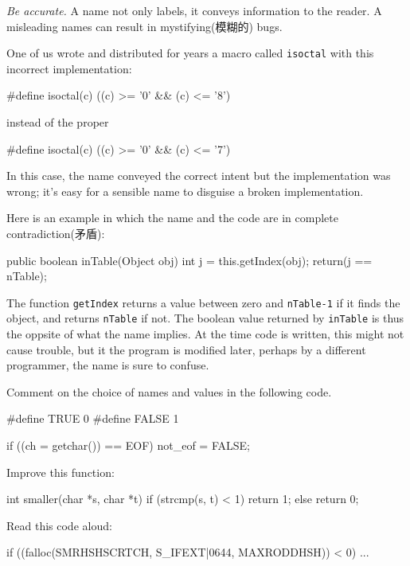 \emph{Be accurate.} A name not only labels, it conveys information to the
reader. A misleading names can result in mystifying(模糊的) bugs.

One of us wrote and distributed for years a macro called \verb"isoctal"
with this incorrect implementation:
\begin{badcode}
    #define isoctal(c) ((c) >= '0' && (c) <= '8')
\end{badcode}
instead of the proper
\begin{wellcode}
    #define isoctal(c) ((c) >= '0' && (c) <= '7')
\end{wellcode}
In this case, the name conveyed the correct intent but the implementation
was wrong; it's easy for a sensible name to disguise a broken
implementation.

Here is an example in which the name and the code are in complete
contradiction(矛盾):
\begin{badcode}
    public boolean inTable(Object obj) {
        int j = this.getIndex(obj);
        return(j == nTable);
    }
\end{badcode}

The function \verb"getIndex" returns a value between zero and
\verb"nTable-1" if it finds the object, and returns \verb"nTable" if not.
The boolean value returned by \verb"inTable" is thus the oppsite of what
the name implies. At the time code is written, this might not cause
trouble, but it the program is modified later, perhaps by a different
programmer, the name is sure to confuse.

\exercise Comment on the choice of names and values in the following code.
\begin{badcode}
    #define TRUE    0
    #define FALSE   1

    if ((ch = getchar()) == EOF)
        not_eof = FALSE;
\end{badcode}

\exercise Improve this function:
\begin{badcode}
    int smaller(char *s, char *t) {
        if (strcmp(s, t) < 1)
            return 1;
        else 
            return 0;
    }
\end{badcode}

\exercise Read this code aloud:
\begin{badcode}
    if ((falloc(SMRHSHSCRTCH, S_IFEXT|0644, MAXRODDHSH)) < 0)
        ...
\end{badcode}

